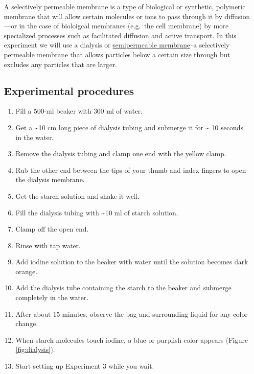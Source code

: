 A selectively permeable membrane is a type of biological or synthetic,
polymeric membrane that will allow certain molecules or ions to pass
through it by diffusion---or in the case of bioloigcal membranes
(e.g.~the cell membrane) by more specialized processes such as
facilitated diffusion and active transport. In this experiment we will
use a dialysis or
\href{https://en.wikipedia.org/wiki/Semipermeable_membranea}{semipermeable
membrane}--a selectively permeable membrane that allows particles below
a certain size through but excludes any particles that are larger.

\subsection{Experimental procedures}\label{experimental-procedures-16}

\begin{enumerate}
\def\labelenumi{\arabic{enumi}.}
\tightlist
\item
  Fill a 500-ml beaker with 300 ml of water.
\item
  Get a \textasciitilde{}10 cm long piece of dialysis tubing and
  submerge it for \textasciitilde{} 10 seconds in the water.
\item
  Remove the dialysis tubing and clamp one end with the yellow clamp.
\item
  Rub the other end between the tips of your thumb and index fingers to
  open the dialysis membrane.
\item
  Get the starch solution and shake it well.
\item
  Fill the dialysis tubing with \textasciitilde{}10 ml of starch
  solution.
\item
  Clamp off the open end.
\item
  Rinse with tap water.
\item
  Add iodine solution to the beaker with water until the solution
  becomes dark orange.
\item
  Add the dialysis tube containing the starch to the beaker and submerge
  completely in the water.
\item
  After about 15 minutes, observe the bag and surrounding liquid for any
  color change.
\item
  When starch molecules touch iodine, a blue or purplish color appears
  (Figure \ref{fig:dialysis}).
\item
  Start setting up Experiment 3 while you wait.
\end{enumerate}

